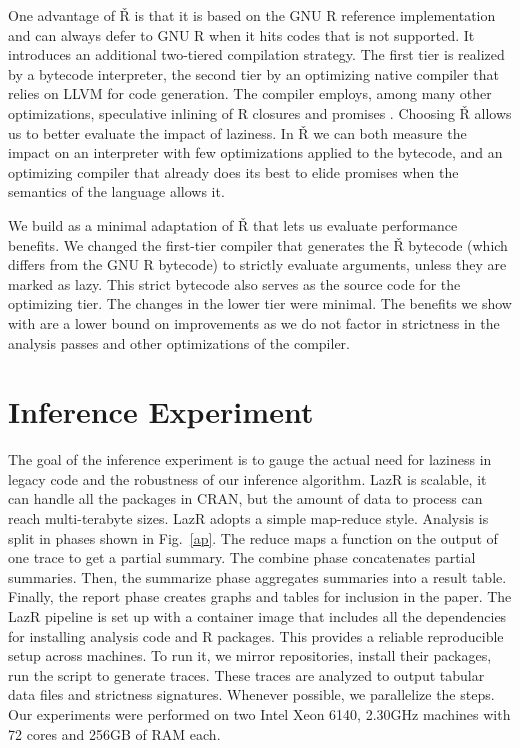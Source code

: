 \documentclass[screen,acmsmall]{acmart}
\newcommand{\lazr}{{\sf LazR}\xspace}
\renewcommand{\Rsh}{{\sf\v R}\xspace}
\begin{document}
One advantage of \Rsh is that it is based on the GNU R reference implementation
and can always defer to GNU R when it hits codes that is not supported. It
introduces an additional two-tiered compilation strategy. The first tier is
realized by a bytecode interpreter, the second tier by an optimizing native
compiler that relies on LLVM for code generation. The compiler employs, among
many other optimizations, speculative inlining of R closures and promises
\citep{dls19, oopsla20c}.
Choosing \Rsh allows us to better evaluate the impact
of laziness. In \Rsh we can both measure the impact on an interpreter with few
optimizations applied to the bytecode, and an optimizing compiler that already
does its best to elide promises when the semantics of the language allows it.

We build \rshstrict as a minimal adaptation of \Rsh that lets us evaluate
performance benefits. We changed the first-tier compiler that generates the \Rsh
bytecode (which differs from the GNU R bytecode) to strictly evaluate arguments,
unless they are marked as lazy. This strict bytecode also serves as the source
code for the optimizing tier. The changes in the lower tier were minimal. The
benefits we show with \rshstrict are a lower bound on improvements as we do not
factor in strictness in the analysis passes and other optimizations of the
compiler.

\section{Inference Experiment}

The goal of the inference experiment is to gauge the actual need for
laziness in legacy code and the robustness of our inference algorithm.
\lazr is scalable, it can handle all the packages in CRAN, but the amount of
data to process can reach multi-terabyte sizes. \lazr adopts a simple map-reduce
style. Analysis is split in phases shown in Fig.~\ref{ap}. The reduce maps a
function on the output of one trace to get a partial summary. The combine phase
concatenates partial summaries. Then, the summarize phase aggregates summaries
into a result table. Finally, the report phase creates graphs and tables for
inclusion in the paper. The \lazr pipeline is set up with a container image that
includes all the dependencies for installing analysis code and R packages. This
provides a reliable reproducible setup across machines. To run it, we mirror
repositories, install their packages, run the script to generate traces.
These
traces are analyzed to output tabular data files and strictness signatures.
Whenever possible, we parallelize the steps. Our experiments were performed on
two Intel Xeon 6140, 2.30GHz machines with 72 cores and 256GB of RAM each.
\end{document}

